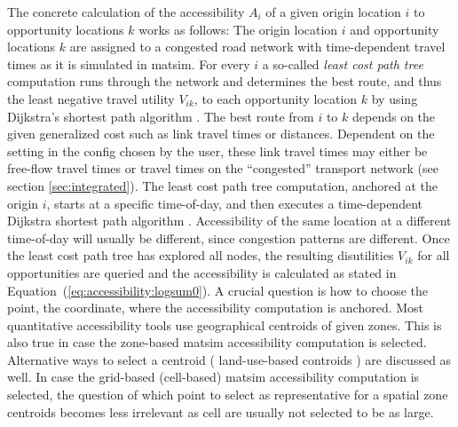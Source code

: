The concrete calculation of the accessibility $A_i$ of a given origin location $i$ to opportunity locations $k$ 
works as follows: The origin location $i$ and opportunity locations $k$ are assigned to a congested road network 
with time-dependent travel times as it is simulated in \gls{matsim}. For every $i$ a so-called 
\textit{least cost path tree} computation runs through the network and determines the best route, and thus the 
least negative travel utility $V_{ik}$, to each opportunity location $k$ by using Dijkstra's shortest path 
algorithm \citep{Dijkstra1959ShortestPath}. The best route from $i$ to $k$ depends on the given generalized cost 
such as link travel times or distances. Dependent on the setting in the config chosen by the user, 
these link travel times may either be free-flow travel 
times or travel times on the ``congested'' transport network (see section \ref{sec:integrated}). The least cost 
path tree computation, anchored at the origin $i$, starts at a specific time-of-day, and then executes a 
time-dependent Dijkstra shortest path algorithm \citep{LefebvreBalmer2007Fastshortestpath}. Accessibility of the 
same location at a different time-of-day will usually be different, since congestion patterns are different.
Once the least cost path tree has explored all nodes, the resulting disutilities $V_{ik}$ for all opportunities 
are queried and the accessibility is calculated as stated in Equation~(\ref{eq:accessibility:logsum0}).
%
A crucial question is how to choose the point, \ie the coordinate, where the accessibility computation is anchored. 
Most quantitative accessibility tools use geographical centroids of given zones. This is also true in case the 
zone-based \gls{matsim} accessibility computation is selected. Alternative ways to select a centroid (\eg 
land-use-based controids \citep{BuettnerEtAl2010Erreichbarkeitsatlas}) are discussed as well. In case the 
grid-based (cell-based) \gls{matsim} accessibility computation is selected, the question of which point to
select as representative for a spatial zone centroids becomes less irrelevant as cell are usually not
selected to be as large.



